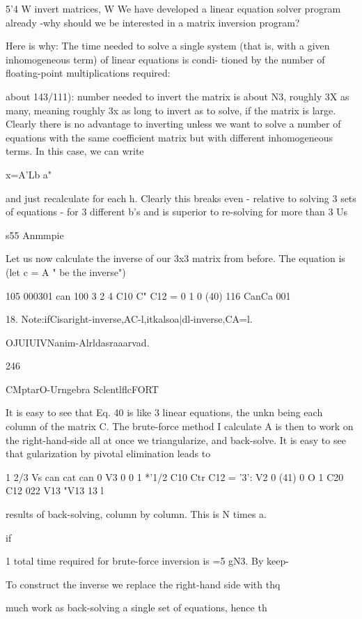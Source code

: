 5'4 W invert matrices, W
We have developed a linear equation solver program already
-why should we be interested in a matrix inversion program?

Here is why: The time needed to solve a single system (that is,
with a given inhomogeneous term) of linear equations is condi-
tioned by the number of floating-point multiplications required:

about 143/111): number needed to invert the matrix is about N3,
roughly 3X as many, meaning roughly 3x as long to invert as to
solve, if the matrix is large. Clearly there is no advantage to
inverting unless we want to solve a number of equations with the
same coefficient matrix but with different inhomogeneous terms.
In this case, we can write

x=A'Lb a"

and just recalculate for each h. Clearly this breaks even - relative
to solving 3 sets of equations - for 3 different b's and is superior
to re-solving for more than 3 Us

s55 Anmmpie

Let us now calculate the inverse of our 3x3 matrix from before.
The equation is (let c = A " be the inverse")

105 000301 can 100
3 2 4 C10 C" C12 = 0 1 0 (40)
116 CanCa 001

 

18. Note:ifCisaright-inverse,AC-l,itkalsoa|dl-inverse,CA=l.

OJUIUIVNanim-Alrldasraaarvad.

246

CMptarO-Urngebra SclentlflcFORT

It is easy to see that Eq. 40 is like 3 linear equations, the unkn
being each column of the matrix C. The brute-force method I
calculate A is then to work on the right-hand-side all at once
we triangularize, and back-solve. It is easy to see that
gularization by pivotal elimination leads to

1 2/3 Vs can cat can 0 V3 0
0 1 *'1/2 C10 Ctr C12 = '3': V2 0 (41)
0 O 1 C20 C12 022 V13 "V13  13 l

results of back-solving, column by column. This is N times a.

if

1
total time required for brute-force inversion is =5 gN3. By keep-

To construct the inverse we replace the right-hand side with thq

much work as back-solving a single set of equations, hence th


